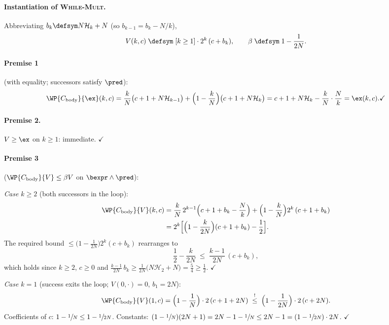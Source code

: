 \paragraph{Instantiation of \textsc{While-Mult}.}
Abbreviating $b_k \defsym N\mathcal{H}_k + N$ (so $b_{k-1} = b_k - N/k$),
\[
  V(k,c) \;\defsym\; [k \geq 1]\cdot 2^{k}\,(c + b_k),
  \qquad
  \beta \;\defsym\; 1 - \frac{1}{2N}.
\]

\paragraph{Premise 1} (with equality; successors satisfy $\pred$):
\[
  \WP{C_{\text{body}}}{\ex}(k,c)
  = \frac{k}{N}\bigl(c+1+N\mathcal{H}_{k-1}\bigr)
  + \Bigl(1-\frac{k}{N}\Bigr)\bigl(c+1+N\mathcal{H}_k\bigr)
  = c + 1 + N\mathcal{H}_k - \frac{k}{N}\cdot\frac{N}{k}
  = \ex(k,c).
  \checkmark
\]

\paragraph{Premise 2.} $V \geq \ex$ on $k \geq 1$: immediate. $\checkmark$

\paragraph{Premise 3} ($\WP{C_{\text{body}}}{V} \leq \beta V$ on
$\bexpr\land\pred$):

\emph{Case $k \geq 2$} (both successors in the loop):
\begin{align*}
  \WP{C_{\text{body}}}{V}(k,c)
  &= \frac{k}{N}\, 2^{k-1}\Bigl(c+1+b_k-\frac{N}{k}\Bigr)
   + \Bigl(1-\frac{k}{N}\Bigr) 2^{k}\,(c+1+b_k) \\
  &= 2^{k}\Bigl[\Bigl(1-\frac{k}{2N}\Bigr)(c+1+b_k) - \frac12\Bigr].
\end{align*}
The required bound $\leq \bigl(1-\tfrac{1}{2N}\bigr)2^k(c+b_k)$ rearranges to
\[
  \frac12 - \frac{k}{2N}
  \;\leq\;
  \frac{k-1}{2N}\,(c+b_k),
\]
which holds since $k \geq 2$, $c \geq 0$ and
$\tfrac{k-1}{2N}\,b_k \geq \tfrac{1}{2N}\bigl(N\mathcal{H}_2+N\bigr)
 = \tfrac54 \geq \tfrac12$. $\checkmark$

\emph{Case $k = 1$} (success exits the loop; $V(0,\cdot) = 0$, $b_1 = 2N$):
\[
  \WP{C_{\text{body}}}{V}(1,c)
  = \Bigl(1-\frac1N\Bigr)\cdot 2\,(c+1+2N)
  \;\overset{!}{\leq}\;
  \Bigl(1-\frac{1}{2N}\Bigr)\cdot 2\,(c+2N).
\]
Coefficients of $c$: $1-\sfrac1N \leq 1-\sfrac{1}{2N}$. Constants:
$(1-\sfrac1N)(2N+1) = 2N-1-\sfrac1N \leq 2N-1
 = (1-\sfrac{1}{2N})\cdot 2N$. $\checkmark$

